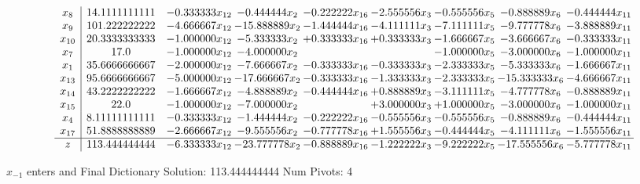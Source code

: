 \documentclass[10pt]{article}
\begin{document}
 \[\begin{array}{c| c c@{\hskip 2pt} c@{\hskip 2pt} c@{\hskip 2pt} c@{\hskip 2pt} c@{\hskip 2pt} c@{\hskip 2pt} c@{\hskip 2pt} }
 x_{8}   &  14.1111111111 & -0.333333 x_{12} & -0.444444 x_{2} & -0.222222 x_{16} & -2.555556 x_{3} & -0.555556 x_{5} & -0.888889 x_{6} & -0.444444 x_{11}\\
 x_{9}   &  101.222222222 & -4.666667 x_{12} & -15.888889 x_{2} & -1.444444 x_{16} & -4.111111 x_{3} & -7.111111 x_{5} & -9.777778 x_{6} & -3.888889 x_{11}\\
 x_{10}   &  20.3333333333 & -1.000000 x_{12} & -5.333333 x_{2} & + 0.333333 x_{16} & + 0.333333 x_{3} & -1.666667 x_{5} & -3.666667 x_{6} & -0.333333 x_{11}\\
 x_{7}   &  17.0 & -1.000000 x_{12} & -4.000000 x_{2} &    &   & -1.000000 x_{5} & -3.000000 x_{6} & -1.000000 x_{11}\\
 x_{1}   &  35.6666666667 & -2.000000 x_{12} & -7.666667 x_{2} & -0.333333 x_{16} & -0.333333 x_{3} & -2.333333 x_{5} & -5.333333 x_{6} & -1.666667 x_{11}\\
 x_{13}   &  95.6666666667 & -5.000000 x_{12} & -17.666667 x_{2} & -0.333333 x_{16} & -1.333333 x_{3} & -2.333333 x_{5} & -15.333333 x_{6} & -4.666667 x_{11}\\
 x_{14}   &  43.2222222222 & -1.666667 x_{12} & -4.888889 x_{2} & -0.444444 x_{16} & + 0.888889 x_{3} & -3.111111 x_{5} & -4.777778 x_{6} & -0.888889 x_{11}\\
 x_{15}   &  22.0 & -1.000000 x_{12} & -7.000000 x_{2} &   & + 3.000000 x_{3} & + 1.000000 x_{5} & -3.000000 x_{6} & -1.000000 x_{11}\\
 x_{4}   &  8.11111111111 & -0.333333 x_{12} & -1.444444 x_{2} & -0.222222 x_{16} & -0.555556 x_{3} & -0.555556 x_{5} & -0.888889 x_{6} & -0.444444 x_{11}\\
 x_{17}   &  51.8888888889 & -2.666667 x_{12} & -9.555556 x_{2} & -0.777778 x_{16} & + 1.555556 x_{3} & -0.444444 x_{5} & -4.111111 x_{6} & -1.555556 x_{11}\\
\hline
z    &  113.444444444 & -6.333333 x_{12} & -23.777778 x_{2} & -0.888889 x_{16} & -1.222222 x_{3} & -9.222222 x_{5} & -17.555556 x_{6} & -5.777778 x_{11}\\
\end{array}\]


 $ x_{-1} $ enters and Final Dictionary
Solution:  113.444444444
Num Pivots:  4
\end{document}
